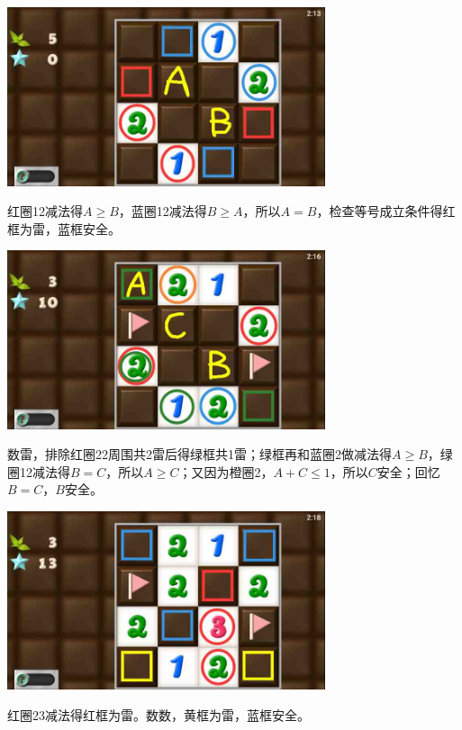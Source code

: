 \subsection{} %
\begin{center}
    \includegraphics[width=0.7\textwidth]{puzzlelow/143-1.jpg}
\end{center}
红圈12减法得$A\ge B$，蓝圈12减法得$B\ge A$，所以$A=B$，检查等号成立条件得红框为雷，蓝框安全。
\begin{center}
    \includegraphics[width=0.7\textwidth]{puzzlelow/143-2.jpg}
\end{center}
数雷，排除红圈22周围共2雷后得绿框共1雷；绿框再和蓝圈2做减法得$A\ge B$，绿圈12减法得$B=C$，所以$A\ge C$；又因为橙圈2，$A+C\le 1$，所以$C$安全；回忆$B=C$，$B$安全。
\begin{center}
    \includegraphics[width=0.7\textwidth]{puzzlelow/143-3.jpg}
\end{center}
红圈23减法得红框为雷。数数，黄框为雷，蓝框安全。

